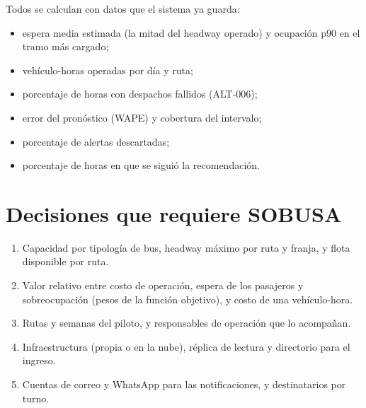 \documentclass[11pt,a4paper]{article}
\begin{document}
Todos se calculan con datos que el sistema ya guarda:

\begin{itemize}
  \setlength{\itemsep}{0.1em}
  \item espera media estimada (la mitad del headway operado) y ocupación p90 en el tramo más cargado;
  \item vehículo-horas operadas por día y ruta;
  \item porcentaje de horas con despachos fallidos (ALT-006);
  \item error del pronóstico (WAPE) y cobertura del intervalo;
  \item porcentaje de alertas descartadas;
  \item porcentaje de horas en que se siguió la recomendación.
\end{itemize}

\section{Decisiones que requiere SOBUSA}

\begin{enumerate}
  \setlength{\itemsep}{0.1em}
  \item Capacidad por tipología de bus, headway máximo por ruta y franja, y flota disponible por ruta.
  \item Valor relativo entre costo de operación, espera de los pasajeros y sobreocupación (pesos de la función objetivo), y costo de una vehículo-hora.
  \item Rutas y semanas del piloto, y responsables de operación que lo acompañan.
  \item Infraestructura (propia o en la nube), réplica de lectura y directorio para el ingreso.
  \item Cuentas de correo y WhatsApp para las notificaciones, y destinatarios por turno.
\end{enumerate}
\end{document}
